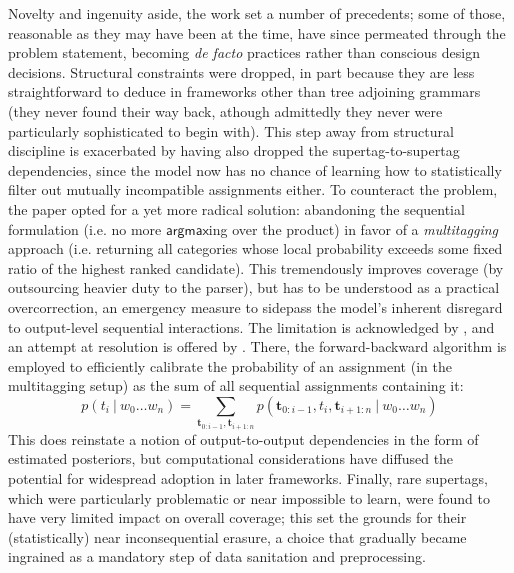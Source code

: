 Novelty and ingenuity aside, the work set a number of precedents; some of those, reasonable as they may have been at the time, have since permeated through the problem statement, becoming \textit{de facto} practices rather than conscious design decisions.
Structural constraints were dropped, in part because they are less straightforward to deduce in frameworks other than tree adjoining grammars (they never found their way back, athough admittedly they never were particularly sophisticated to begin with).
This step away from structural discipline is exacerbated by having also dropped the supertag-to-supertag dependencies, since the model now has no chance of learning how to statistically filter out mutually incompatible assignments either.
To counteract the problem, the paper opted for a yet more radical solution: abandoning the sequential formulation (i.e. no more $\mathsf{argmax}$ing over the product) in favor of a \textit{multitagging} approach (i.e. returning all categories whose local probability exceeds some fixed ratio of the highest ranked candidate).
This tremendously improves coverage (by outsourcing heavier duty to the parser), but has to be understood as a practical overcorrection, an emergency measure to sidepass the model's inherent disregard to output-level sequential interactions.
The limitation is acknowledged by \citet{clark-curran-2004-importance}, and an attempt at resolution is offered by \citet{curran2006multi}.
There, the forward-backward algorithm is employed to efficiently calibrate the probability of an assignment (in the multitagging setup) as the sum of all sequential assignments containing it:
\begin{equation}
	p(t_i \ | \ w_0\dots w_n) = \sum_{\mathbf{t}_{0:i-1}, \mathbf{t}_{i+1:n}} p(\mathbf{t}_{0:i-1}, t_i, \mathbf{t}_{i+1:n} \ | \ w_0 \dots w_n)
\end{equation}
This does reinstate a notion of output-to-output dependencies in the form of estimated posteriors, but computational considerations have diffused the potential for widespread adoption in later frameworks. 
Finally, rare supertags, which were particularly problematic or near impossible to learn, were found to have very limited impact on overall coverage; this set the grounds for their (statistically) near inconsequential erasure, a choice that gradually became ingrained as a mandatory step of data sanitation and preprocessing.


